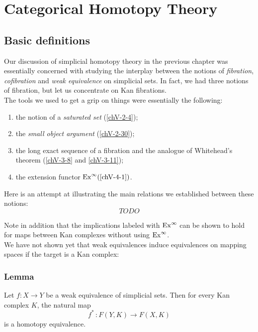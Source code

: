 \chapter{Categorical Homotopy Theory}
\section{Basic definitions}\label{chVI-1}
    Our discussion of simplicial homotopy theory in the previous chapter was essentially concerned with studying the interplay between the notions of \emph{fibration}, \emph{cofibration} and \emph{weak equivalence} on simplicial sets. In fact, we had three notions of fibration, but let us concentrate on Kan fibrations.\\
    The tools we used to get a grip on things were essentially the following:
    \begin{enumerate}[label=\roman*)]
        \item 
            the notion of a \emph{saturated set} (\ref{chV-2-4});
        \item 
            the \emph{small object argument} (\ref{chV-2-30});
        \item 
            the long exact sequence of a fibration and the analogue of Whitehead's theorem (\ref{chV-3-8} and \ref{chV-3-11});
        \item 
            the extension functor $\operatorname{Ex}^{\infty} (\ref{chV-4-1})$.
    \end{enumerate}
    Here is an attempt at illustrating the main relations we established between these notions:
    \begin{equation*}
        TODO
    \end{equation*}

    Note in addition that the implications labeled with $\operatorname{Ex}^{\infty}$ can be shown to hold for maps between Kan complexes without using $\operatorname{Ex}^{\infty}$.\\

    We have not shown yet that weak equivalences induce equivalences on mapping spaces if the target is a Kan complex:

    \subsection{Lemma}\label{chVI-1-1}
        Let $f \colon X \to Y$ be a weak equivalence of simplicial sets. Then for every Kan complex $K$, the natural map
        \begin{equation*}
            f^{*} \,\colon F(Y, K) \to F(X, K)
        \end{equation*}
        is a homotopy equivalence.
        \smallskip

